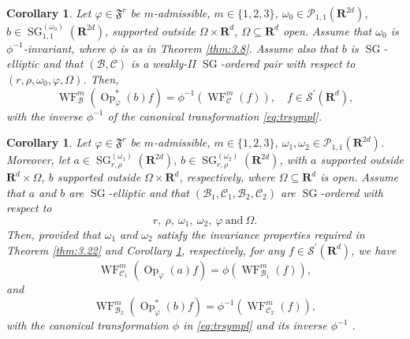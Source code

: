 \documentclass[12pt,a4paper,reqno]{amsart}
\numberwithin{equation}{section}
\numberwithin{thm}{section}
\newtheorem{cor}[thm]{Corollary}
\theoremstyle{definition}
\theoremstyle{remark}
\begin{document}
\begin{cor}
\label{cor:FIOWFSell}
Let $\varphi\in{\mathfrak{F}^r}$ be $m$-admissible, $m\in\{1,2,3\}$, 
$\omega_0\in \mathscr P_{1,1}({\mathbf R^{{2d}}})$, 
$b\in{\operatorname{SG}}^{(\omega_0)}_{1,1}({\mathbf R^{{2d}}})$, supported outside $\Omega\times{\mathbf R^{{d}}}$,
$\Omega\subseteq{\mathbf R^{{d}}}$ open. Assume that $\omega_0$ is $\phi^{-1}$-invariant,
where $\phi$ is as  in Theorem \ref{thm:3.8}. Assume also that $b$ is ${\operatorname{SG}}$-elliptic
and that $({{\mathcal B}},{{\mathcal C}})$ is a weakly-II ${\operatorname{SG}}$-ordered pair with respect to
$(r,\rho ,\omega _0,\varphi ,\Omega )$. Then, 
\begin{equation}\label{eq:ellwfbis}
	{\operatorname{WF}}^{m}_{{\mathcal B}}({\operatorname{Op}}_\varphi^*(b)f) = \phi^{-1}({\operatorname{WF}}^{m}_{{\mathcal C}}(f)),\quad f
\in \mathscr{S}^\prime({\mathbf R^{{d}}}),
\end{equation}
with the inverse $\phi^{-1}$ of the canonical transformation \eqref{eq:trsympl}.
\end{cor}

\begin{cor}
\label{cor:FIOWFSellter}
Let $\varphi\in{\mathfrak{F}^r}$ be $m$-admissible, $m\in\{1,2,3\}$, 
$\omega_1,\omega_2\in \mathscr P_{1,1}({\mathbf R^{{2d}}})$. Moreover, let
$a\in{\operatorname{SG}}^{(\omega_1)}_{r,\rho}({\mathbf R^{{2d}}})$,
$b\in{\operatorname{SG}}^{(\omega_2)}_{r,\rho}({\mathbf R^{{2d}}})$, with $a$ supported outside ${\mathbf R^{{d}}}\times\Omega$,
$b$ supported outside $\Omega\times{\mathbf R^{{d}}}$, respectively, where
$\Omega\subseteq{\mathbf R^{{d}}}$ is open. 
Assume that $a$ and $b$ are ${\operatorname{SG}}$-elliptic
and that $({{\mathcal B}}_1,{{\mathcal C}}_1,{{\mathcal B}}_2,{{\mathcal C}}_2)$ are ${\operatorname{SG}}$-ordered with respect to
$$
r,\  \rho,\ \omega _1 ,\ \omega _2 ,\ \varphi \ \text{and}\ \Omega  .
$$
Then, provided that $\omega_1$ and $\omega_2$ satisfy the invariance properties
required in Theorem \ref{thm:3.22} and Corollary \ref{cor:FIOWFSell}, respectively,
for any $f \in {{\mathscr S}}^\prime({\mathbf R^{{d}}})$, we have
\[
{\operatorname{WF}}^{m}_{{{\mathcal C}}_1}({\operatorname{Op}}_\varphi(a)f) = \phi({\operatorname{WF}}^{m}_{{{\mathcal B}}_1}(f)),
\]
and
\[
	{\operatorname{WF}}^{m}_{{{\mathcal B}}_2}({\operatorname{Op}}_\varphi^*(b)f) = \phi^{-1}({\operatorname{WF}}^{m}_{{{\mathcal C}}_2}(f)),
\]
with the canonical transformation $\phi$ in \eqref{eq:trsympl} and its inverse $\phi^{-1}$ .
\end{cor}
\end{document}
